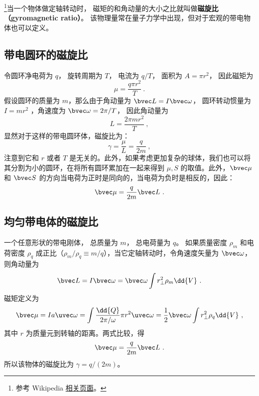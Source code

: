 


\footnote{参考 Wikipedia \href{https://en.wikipedia.org/wiki/Gyromagnetic_ratio}{相关页面}。}当一个物体做定轴转动时， 磁矩的和角动量的大小之比就叫做\textbf{磁旋比（gyromagnetic ratio）}。 该物理量常在量子力学中出现，但对于宏观的带电物体也可以定义。

\subsection{带电圆环的磁旋比}
令圆环净电荷为 $q$， 旋转周期为 $T$， 电流为 $q/T$， 面积为 $A= \pi r^2$， 因此磁矩为
\begin{equation}
\mu=\frac{q\pi r^2}{T}~.
\end{equation}
假设圆环的质量为 $m$，那么由于角动量为 $\bvec L = I\bvec\omega$， 圆环转动惯量为 $I = mr^2$ ，角速度为 $\bvec \omega = 2\pi/T$， 因此角动量为
\begin{equation}
L = \frac{2\pi m r^2}{T}~,
\end{equation}
显然对于这样的带电圆环体，磁旋比为：
\begin{equation}
\gamma = \frac{\mu}{L} = \frac{q}{2m}~,
\end{equation}
注意到它和 $r$ 或者 $T$ 是无关的。此外，如果考虑更加复杂的球体，我们也可以将其分割为小的圆环，在将所有圆环累加在一起来得到 $\mu,S$ 的取值。此外，$\bvec \mu$ 和 $\bvec S$ 的方向当电荷为正时是同向的，当电荷为负时是相反的，因此：
\begin{equation}
\bvec \mu = \frac{q}{2m}\bvec L~.
\end{equation}

\subsection{均匀带电体的磁旋比}
一个任意形状的带电刚体， 总质量为 $m$， 总电荷量为 $q$。 如果质量密度 $\rho_m$ 和电荷密度 $\rho_q$ 成正比（$\rho_m/\rho_q \equiv m/q$），当它定轴转动时，令角速度矢量为 $\bvec\omega$， 则角动量为
\begin{equation}
\bvec L = I\bvec \omega  = \bvec \omega \int r_\bot^2 \rho_m \dd{V}~.
\end{equation}
磁矩定义为
\begin{equation}
\bvec \mu  = Ia \uvec\omega = \int \frac{\dd{Q}}{2\pi/\omega}  \pi r^2 \uvec \omega
= \frac12 \bvec \omega \int r_\bot^2\rho_q \dd{V} ~,
\end{equation}
其中 $r$ 为质量元到转轴的距离。两式比较，得
\begin{equation}
\bvec \mu  = \frac{q}{2m} \bvec L~.
\end{equation}
所以该物体的磁旋比为 $\gamma = q/(2m)$。

